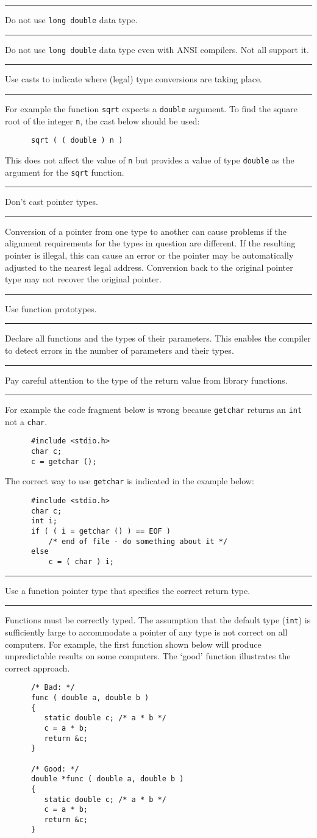 \documentclass[twoside,11pt]{article}
\newcounter{sruleno}
\newcommand{\srule}[1]{
    \addtocounter{sruleno}{1}
    \goodbreak
    \rule[0.5ex]{\textwidth}{0.3mm}
    {\Large #1 \hfill {\thesruleno}}
    \rule[0.5ex]{\textwidth}{0.1mm}
}
\newcommand{\srule}[1]{
       \addtocounter{sruleno}{1}
       \begin{rawhtml} <HR> \end{rawhtml}
       {\Large \thesruleno}~~~~{\Large #1}
       \begin{rawhtml} <HR> \end{rawhtml}
       \end{tabular}
  }
\begin{document}
\srule{Do not use {\tt long double} data type.}
Do not use {\tt long double} data type even with ANSI compilers. Not all 
support it.

\srule{Use casts to indicate where (legal) type conversions are taking 
place.}
For example the function {\tt sqrt} expects a {\tt double} argument.
To find the square root of the integer {\tt n}, the cast below should be 
used:
\begin{verbatim}
      sqrt ( ( double ) n )
\end{verbatim}
This does not affect the value of {\tt n} but provides a value of type 
{\tt double} as the argument for the {\tt sqrt} function.


\srule{Don't cast pointer types.}
Conversion of a pointer from one type to another can cause problems if the 
alignment requirements for the types in question are different.
If the resulting pointer is illegal, this can cause an error or the pointer 
may be automatically adjusted to the nearest legal address.
Conversion back to the original pointer type may not recover the original
pointer.

\srule{Use function prototypes.}
Declare all functions and the types of their parameters.  This enables the 
compiler to detect errors in the number of parameters and their types.

\srule{Pay careful attention to the type of the return value from 
library functions.}
For example the code fragment below is wrong because {\tt getchar} returns 
an {\tt int} not a {\tt char}.
\begin{verbatim}
      #include <stdio.h>
      char c;
      c = getchar ();
\end{verbatim}
The correct way to use {\tt getchar} is indicated in the example below:
\begin{verbatim}
      #include <stdio.h>
      char c;
      int i;
      if ( ( i = getchar () ) == EOF )
          /* end of file - do something about it */
      else
          c = ( char ) i;                                  
\end{verbatim}

\srule{Use a function pointer type that specifies the correct return type.}
Functions must be correctly typed.
The assumption that the default
type ({\tt int}) is sufficiently large to accommodate a pointer of any
type is not correct on all computers. 
For example,  the first function shown below will produce unpredictable
results on some computers. 
The `good' function illustrates the correct approach.
\begin{verbatim}
      /* Bad: */
      func ( double a, double b )
      {
         static double c; /* a * b */
         c = a * b;
         return &c;
      }

      /* Good: */
      double *func ( double a, double b )
      {
         static double c; /* a * b */
         c = a * b;
         return &c;
      }
\end{verbatim}
\end{document}
